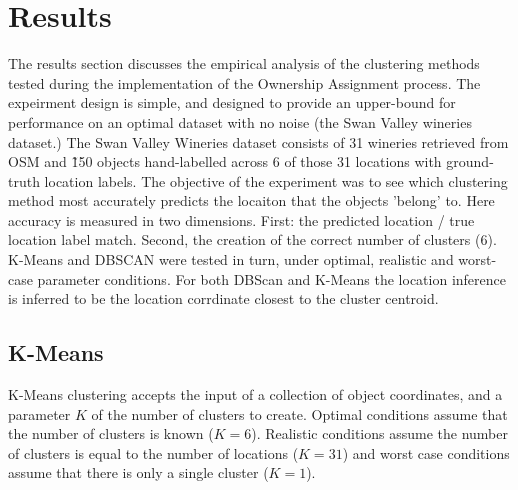 \section{Results}
\label{section:results}

The results section discusses the empirical analysis of the clustering methods tested during the implementation of the Ownership Assignment process. 
The expeirment design is simple, and designed to provide an upper-bound for performance on an optimal dataset with no noise (the Swan Valley wineries dataset.) 
The Swan Valley Wineries dataset consists of 31 wineries retrieved from OSM and \~150 objects hand-labelled across 6 of those 31 locations with ground-truth location labels. 
The objective of the experiment was to see which clustering method most accurately predicts the locaiton that the objects 'belong' to. Here accuracy is measured in two dimensions. 
First: the predicted location / true location label match. Second, the creation of the correct number of clusters (6).
K-Means and DBSCAN were tested in turn, under optimal, realistic and worst-case parameter conditions. For both DBScan and K-Means the location inference is inferred to be the location corrdinate closest to the cluster centroid. 

\subsection{K-Means}
K-Means clustering accepts the input of a collection of object coordinates, and a parameter $K$ of the number of clusters to create. 
Optimal conditions assume that the number of clusters is known ($K=6$). 
Realistic conditions assume the number of clusters is equal to the number of locations ($K=31$) and worst case conditions assume that there is only a single cluster ($K=1$). 

